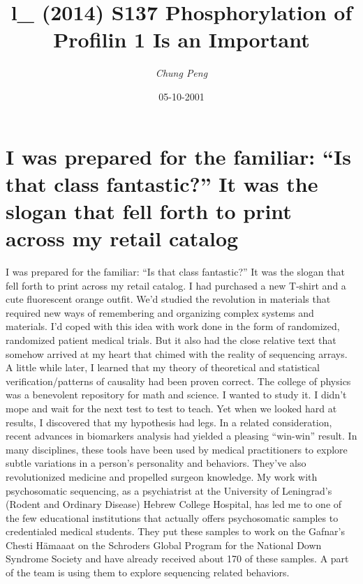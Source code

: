 \documentclass{article}%
\title{l\_ (2014) S137 Phosphorylation of Profilin 1 Is an Important}%
\author{\textit{Chung Peng}}%
\date{05-10-2001}%
\begin{document}
%
\normalsize%
\maketitle%
\section{I was prepared for the familiar: “Is that class fantastic?”\newline%
It was the slogan that fell forth to print across my retail catalog}%
\label{sec:IwaspreparedforthefamiliarIsthatclassfantastic?Itwasthesloganthatfellforthtoprintacrossmyretailcatalog}%
I was prepared for the familiar: “Is that class fantastic?”\newline%
It was the slogan that fell forth to print across my retail catalog. I had purchased a new T{-}shirt and a cute fluorescent orange outfit. We’d studied the revolution in materials that required new ways of remembering and organizing complex systems and materials.\newline%
I’d coped with this idea with work done in the form of randomized, randomized patient medical trials. But it also had the close relative text that somehow arrived at my heart that chimed with the reality of sequencing arrays.\newline%
A little while later, I learned that my theory of theoretical and statistical verification/patterns of causality had been proven correct. The college of physics was a benevolent repository for math and science. I wanted to study it.\newline%
I didn’t mope and wait for the next test to test to teach. Yet when we looked hard at results, I discovered that my hypothesis had legs. In a related consideration, recent advances in biomarkers analysis had yielded a pleasing “win{-}win” result. In many disciplines, these tools have been used by medical practitioners to explore subtle variations in a person’s personality and behaviors. They’ve also revolutionized medicine and propelled surgeon knowledge.\newline%
My work with psychosomatic sequencing, as a psychiatrist at the University of Leningrad’s (Rodent and Ordinary Disease) Hebrew College Hospital, has led me to one of the few educational institutions that actually offers psychosomatic samples to credentialed medical students.\newline%
They put these samples to work on the Gafnar’s Chesti Hämaaat on the Schroders Global Program for the National Down Syndrome Society and have already received about 170 of these samples. A part of the team is using them to explore sequencing related behaviors.\newline%
\end{document}

